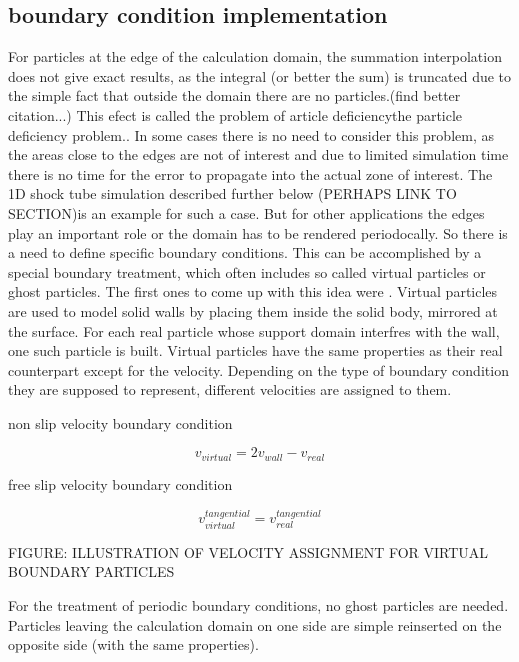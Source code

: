 \documentclass{report}
\begin{document}
\subsection{boundary condition implementation}
\label{sec:boundaryConditionImplementation}
For particles at the edge of the calculation domain, the summation interpolation does not
give exact results, as the integral (or better the sum) is truncated due to
the simple fact that outside the domain there are no
particles.\cite{Liu2003}(find better citation...) This efect is called the
problem of article deficiencythe particle deficiency
problem.\cite{Liu2003}. In some cases there is no need to consider this
problem, as the areas close to the edges are not of interest and due to
limited simulation time there is no time for the error to propagate into the
actual zone of interest. The 1D shock tube simulation described further below
(PERHAPS LINK TO SECTION)is an example for such a case.  
But for other applications the edges play an important role or the domain has
to be rendered periodocally. So there is a need to define specific boundary
conditions. This can be accomplished by a special boundary treatment, which
often includes so called virtual particles or ghost
particles\cite{Liu2003}. The first ones to come up with this idea were
\cite{LIBERSKY1993}. Virtual particles are used to model solid walls by
placing them inside the solid body, mirrored at the surface. For each real
particle whose support domain interfres with the wall, one such particle is
built. Virtual particles have the same properties as their real counterpart
except for the velocity. Depending on the type of boundary condition they are
supposed to represent, different velocities are assigned to them.\cite{Hu2006}

non slip velocity boundary condition

\begin{equation}
v_{virtual}=2v_{wall}-v_{real}
\end{equation}

free slip velocity boundary condition

\begin{equation}
v_{virtual}^{tangential}=v_{real}^{tangential}
\end{equation}

FIGURE: ILLUSTRATION OF VELOCITY ASSIGNMENT FOR VIRTUAL BOUNDARY PARTICLES

For the treatment of periodic boundary conditions, no ghost particles are
needed. Particles leaving the calculation domain on one side are simple
reinserted on the opposite side (with the same properties).
\end{document}
